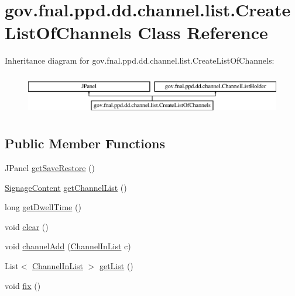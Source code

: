 \hypertarget{classgov_1_1fnal_1_1ppd_1_1dd_1_1channel_1_1list_1_1CreateListOfChannels}{\section{gov.\-fnal.\-ppd.\-dd.\-channel.\-list.\-Create\-List\-Of\-Channels Class Reference}
\label{classgov_1_1fnal_1_1ppd_1_1dd_1_1channel_1_1list_1_1CreateListOfChannels}
}
Inheritance diagram for gov.\-fnal.\-ppd.\-dd.\-channel.\-list.\-Create\-List\-Of\-Channels\-:\begin{figure}[H]
\begin{center}
\leavevmode
\includegraphics[height=1.836066cm]{classgov_1_1fnal_1_1ppd_1_1dd_1_1channel_1_1list_1_1CreateListOfChannels}
\end{center}
\end{figure}
\subsection*{Public Member Functions}
\begin{DoxyCompactItemize}
\item 
J\-Panel \hyperlink{classgov_1_1fnal_1_1ppd_1_1dd_1_1channel_1_1list_1_1CreateListOfChannels_a61f43bd5b3bba837c4f210f5d5dae22f}{get\-Save\-Restore} ()
\item 
\hyperlink{interfacegov_1_1fnal_1_1ppd_1_1dd_1_1signage_1_1SignageContent}{Signage\-Content} \hyperlink{classgov_1_1fnal_1_1ppd_1_1dd_1_1channel_1_1list_1_1CreateListOfChannels_a1dd7205ca04851ccb375e04919cb91ca}{get\-Channel\-List} ()
\item 
long \hyperlink{classgov_1_1fnal_1_1ppd_1_1dd_1_1channel_1_1list_1_1CreateListOfChannels_afe71d92d0b9f2df4eccd8a4ddefa08a0}{get\-Dwell\-Time} ()
\item 
void \hyperlink{classgov_1_1fnal_1_1ppd_1_1dd_1_1channel_1_1list_1_1CreateListOfChannels_a1ec0b549bcd66b851487792a951880f2}{clear} ()
\item 
void \hyperlink{classgov_1_1fnal_1_1ppd_1_1dd_1_1channel_1_1list_1_1CreateListOfChannels_a45a7590a0959d934a3c084af35bcd80c}{channel\-Add} (\hyperlink{interfacegov_1_1fnal_1_1ppd_1_1dd_1_1channel_1_1ChannelInList}{Channel\-In\-List} c)
\item 
List$<$ \hyperlink{interfacegov_1_1fnal_1_1ppd_1_1dd_1_1channel_1_1ChannelInList}{Channel\-In\-List} $>$ \hyperlink{classgov_1_1fnal_1_1ppd_1_1dd_1_1channel_1_1list_1_1CreateListOfChannels_a69c4ef63a7b4679fdb998e5a801b8203}{get\-List} ()
\item 
void \hyperlink{classgov_1_1fnal_1_1ppd_1_1dd_1_1channel_1_1list_1_1CreateListOfChannels_a5b161ef966b292e003862b6aeb584647}{fix} ()
\end{DoxyCompactItemize}
